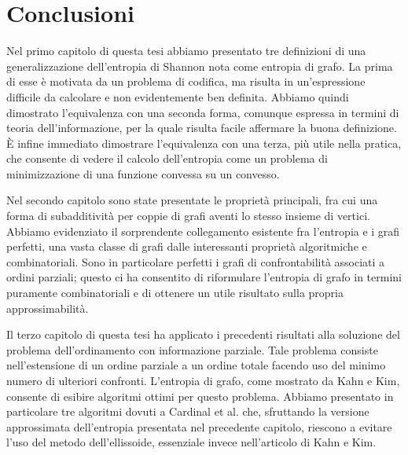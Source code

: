 \chapter{Conclusioni}
Nel primo capitolo di questa tesi abbiamo presentato tre definizioni di una 
generalizzazione dell'entropia di Shannon nota come entropia di grafo. La 
prima di esse è motivata da un problema di codifica, ma risulta in 
un'espressione difficile da calcolare e non evidentemente ben definita. 
Abbiamo quindi dimostrato l'equivalenza con una seconda forma, comunque 
espressa in termini di teoria dell'informazione, per la quale risulta facile 
affermare la buona definizione. È infine immediato dimostrare l'equivalenza 
con una terza, più utile nella pratica, che consente di vedere il calcolo 
dell'entropia come un problema di minimizzazione di una funzione convessa su 
un convesso.

Nel secondo capitolo sono state presentate le proprietà principali, fra cui
una forma di subadditività per coppie di grafi aventi lo stesso insieme di
vertici. Abbiamo evidenziato il sorprendente collegamento esistente fra
l'entropia e i grafi perfetti, una vasta classe di grafi dalle interessanti
proprietà algoritmiche e combinatoriali. Sono in particolare perfetti i grafi
di confrontabilità associati a ordini parziali; questo ci ha consentito di
riformulare l'entropia di grafo in termini puramente combinatoriali e di
ottenere un utile risultato sulla propria approssimabilità.

Il terzo capitolo di questa tesi ha applicato i precedenti risultati alla
soluzione del problema dell'ordinamento con informazione parziale. Tale
problema consiste nell'estensione di un ordine parziale a un ordine totale
facendo uso del minimo numero di ulteriori confronti. L'entropia di grafo,
come mostrato da Kahn e Kim, consente di esibire algoritmi ottimi per questo 
problema. Abbiamo presentato in particolare tre algoritmi dovuti a Cardinal et
al. che, sfruttando la versione approssimata dell'entropia presentata nel
precedente capitolo, riescono a evitare l'uso del metodo dell'ellissoide,
essenziale invece nell'articolo di Kahn e Kim.

